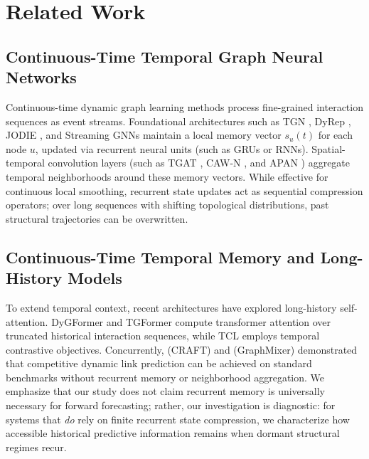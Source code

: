 \documentclass[10pt,twocolumn,letterpaper]{article}
\begin{document}
\section{Related Work}
\label{sec:related_work}

\subsection{Continuous-Time Temporal Graph Neural Networks}
Continuous-time dynamic graph learning methods process fine-grained interaction sequences as event streams. Foundational architectures such as TGN \citep{rossi2020temporal}, DyRep \citep{trivedi2019dyrep}, JODIE \citep{kumar2019predicting}, and Streaming GNNs \citep{ma2020streaming, wang2020streaming} maintain a local memory vector $s_u(t)$ for each node $u$, updated via recurrent neural units (such as GRUs or RNNs). Spatial-temporal convolution layers (such as TGAT \citep{xu2020inductive}, CAW-N \citep{wang2021inductive}, and APAN \citep{wang2021apan}) aggregate temporal neighborhoods around these memory vectors. While effective for continuous local smoothing, recurrent state updates act as sequential compression operators; over long sequences with shifting topological distributions, past structural trajectories can be overwritten.

\subsection{Continuous-Time Temporal Memory and Long-History Models}
To extend temporal context, recent architectures have explored long-history self-attention. DyGFormer \citep{yu2023towards} and TGFormer \citep{li2023tgformer} compute transformer attention over truncated historical interaction sequences, while TCL \citep{wang2021tcl} employs temporal contrastive objectives. Concurrently, \citet{sankar2023craft} (CRAFT) and \citet{cong2023graphmixer} (GraphMixer) demonstrated that competitive dynamic link prediction can be achieved on standard benchmarks without recurrent memory or neighborhood aggregation. We emphasize that our study does not claim recurrent memory is universally necessary for forward forecasting; rather, our investigation is diagnostic: for systems that \textit{do} rely on finite recurrent state compression, we characterize how accessible historical predictive information remains when dormant structural regimes recur.
\end{document}
